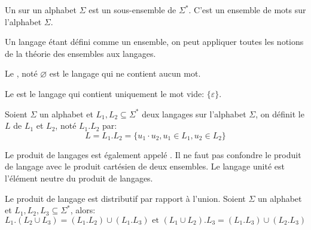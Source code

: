 \begin{definition}
    Un  sur un alphabet \( \Sigma \) est un sous-ensemble de \( \Sigma^* \). C'est un ensemble de mots sur l'alphabet \( \Sigma \).
\end{definition}

Un langage étant défini comme un ensemble, on peut appliquer toutes les notions de la théorie des ensembles aux langages.

\begin{definition}
    Le , noté \( \varnothing \) est le langage qui ne contient aucun mot.
\end{definition}

\begin{definition}
    Le  est le langage qui contient uniquement le mot vide: \( \{ \varepsilon \} \).
\end{definition}


\begin{definition}
    Soient \( \Sigma \) un alphabet et \( L_1, L_2 \subseteq \Sigma^* \) deux langages sur l'alphabet \( \Sigma \), on définit le  \( L \) de \( L_1 \) et \( L_2 \), noté \( L_1 . L_2 \) par:
    \begin{equation}
        L = L_1 . L_2 = \{ u_1 \cdot u_2, u_1 \in L_1, u_2 \in L_2 \}
    \end{equation}
\end{definition}

Le produit de langages est également appelé . Il ne faut pas confondre le produit de langage avec le produit cartésien de deux ensembles. Le langage unité est l'élément neutre du produit de langages.

\begin{proposition}
    Le produit de langage est distributif par rapport à l'union. Soient \( \Sigma \) un alphabet et \( L_1, L_2, L_3 \subseteq \Sigma^* \), alors:
    \begin{equation}
        L_1 . (L_2 \cup L_3) = (L_1 . L_2) \cup (L_1 . L_3) \text{ et } (L_1 \cup L_2) . L_3 = (L_1 . L_3) \cup (L_2 . L_3)
    \end{equation}
\end{proposition}

